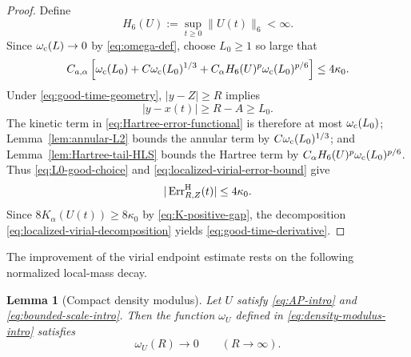 \documentclass[preprint,12pt]{elsarticle}
\numberwithin{equation}{section}
\newtheorem{lemma}[theorem]{Lemma}
\theoremstyle{remark}
\newcommand{\Kcal}{K_{\alpha}}
\newcommand{\Err}{\operatorname{Err}}
\begin{document}
\begin{proof}
Define
\begin{equation*}
  H_6(U):=\sup_{t\ge0}\|U(t)\|_6<\infty.
\end{equation*}
Since $\omega_{\rm c}(L)\to0$ by \eqref{eq:omega-def}, choose $L_0\ge1$ so large that
\begin{equation}\label{eq:L0-good-choice}
  C_{a,\alpha}\left[
  \omega_{\rm c}(L_0)
  +C\omega_{\rm c}(L_0)^{1/3}
  +C_\alpha H_6(U)^p\omega_{\rm c}(L_0)^{p/6}
  \right]
  \le4\kappa_0.
\end{equation}
Under \eqref{eq:good-time-geometry}, $|y-Z|\ge R$ implies
\begin{equation*}
  |y-x(t)|\ge R-A\ge L_0.
\end{equation*}
The kinetic term in \eqref{eq:Hartree-error-functional} is therefore at most $\omega_{\rm c}(L_0)$; Lemma~\ref{lem:annular-L2} bounds the annular term by $C\omega_{\rm c}(L_0)^{1/3}$; and Lemma~\ref{lem:Hartree-tail-HLS} bounds the Hartree term by $C_\alpha H_6(U)^p\omega_{\rm c}(L_0)^{p/6}$. Thus \eqref{eq:L0-good-choice} and \eqref{eq:localized-virial-error-bound} give
\begin{equation*}
  |\Err_{R,Z}^{\rm H}(t)|\le4\kappa_0.
\end{equation*}
Since $8\Kcal(U(t))\ge8\kappa_0$ by \eqref{eq:K-positive-gap}, the decomposition \eqref{eq:localized-virial-decomposition} yields \eqref{eq:good-time-derivative}.
\end{proof}

The improvement of the virial endpoint estimate rests on the following normalized local-mass decay.

\begin{lemma}[Compact density modulus]\label{lem:density-modulus}
Let $U$ satisfy \eqref{eq:AP-intro} and \eqref{eq:bounded-scale-intro}. Then the function $\omega_U$ defined in \eqref{eq:density-modulus-intro} satisfies
\begin{equation}\label{eq:density-modulus-decay}
  \omega_U(R)\longrightarrow0
  \qquad(R\to\infty).
\end{equation}
\end{lemma}
\end{document}
